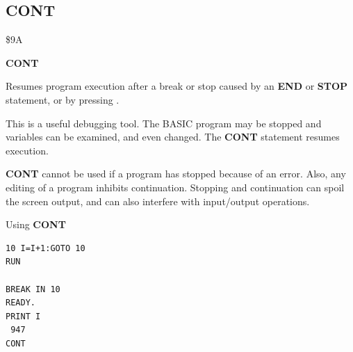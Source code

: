 \subsection{CONT}
\begin{description}[leftmargin=2cm,style=nextline]
\item [Token:] \$9A
\item [Format:] {\bf CONT}
\item [Usage:] Resumes
               program execution after a break or stop caused by
               an {\bf END} or {\bf STOP} statement, or by pressing
               .

               This is a useful debugging tool. The BASIC program may be stopped
               and variables can be examined, and even changed.
               The {\bf CONT} statement resumes execution.
\item [Remarks:] {\bf CONT} cannot be used if a program has stopped because
               of an error. Also, any editing of a program
               inhibits continuation. Stopping and continuation
               can spoil the screen output, and can also interfere with
               input/output operations.
\item [Example:] Using {\bf CONT}
\begin{tcolorbox}[colback=black,coltext=white]
\verbatimfont{\codefont}
\begin{verbatim}
10 I=I+1:GOTO 10
RUN

BREAK IN 10
READY.
PRINT I
 947
CONT
\end{verbatim}
\end{tcolorbox}
\end{description}


\newpage

